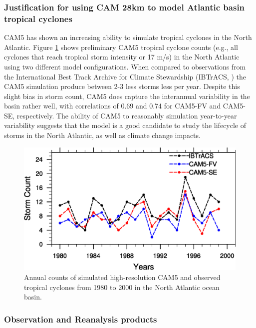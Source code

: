 \documentclass[11pt]{article}
\begin{document}
\subsubsection{Justification for using CAM 28km to model Atlantic basin tropical cyclones}

CAM5 has shown an increasing ability to simulate tropical cyclones in the North Atlantic.  Figure \ref{fig:NATCs} shows preliminary CAM5 tropical cyclone counts (e.g., all cyclones that reach tropical storm intensity or 17 m/s) in the North Atlantic using two different model configurations. When compared to observations from the International Best Track Archive for Climate Stewardship (IBTrACS, \citet{Knapp2010}) the CAM5 simulation produce  between 2-3 less storms less per year. Despite this slight bias in storm count, CAM5 does capture the interannual variability in the basin rather well, with correlations of 0.69 and 0.74 for CAM5-FV and CAM5-SE, respectively. The ability of CAM5 to reasonably simulation year-to-year variability suggests that the model is a good candidate to study the lifecycle of storms in the North Atlantic, as well as climate change impacts.

\begin{figure}[p]
\begin{center}
\includegraphics[width=6in]{NA_interannual.eps}
\end{center}
\caption{Annual counts of simulated high-resolution CAM5 and observed tropical cyclones from 1980 to 2000 in the North Atlantic ocean basin.} \label{fig:NATCs}
\end{figure}

\subsubsection{Observation and Reanalysis products}
\end{document}
